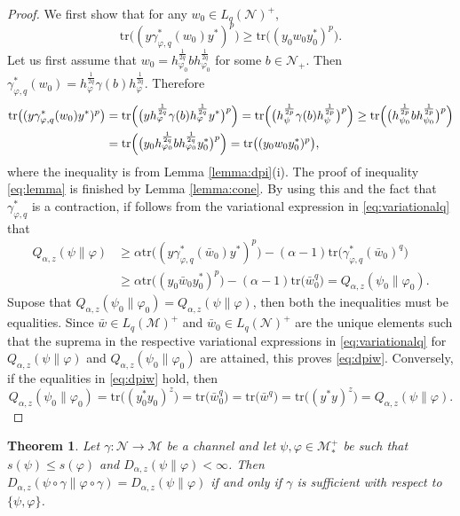 \documentclass[12pt]{article}
\newtheorem{theorem}{Theorem}[section]
\theoremstyle{definition}
\theoremstyle{remark}
\numberwithin{equation}{section}
\def\Me{\mathcal M}
\def\Ne{\mathcal N}
\def\Tr{\mathrm{tr}}
\def\ffi{\varphi}
\begin{document}
\begin{proof} We first show that  for any $w_0\in L_q(\Ne)^+$,
\begin{equation}\label{eq:lemma}
\Tr\bigl((y\gamma^*_{\ffi,q}(w_0)y^*)^p\bigr)\ge
\Tr\bigl((y_0w_0y_0^*)^p\bigr).
\end{equation}
Let us first assume that
$w_0=h_{\varphi_0}^{\frac1{2q}}bh_{\varphi_0}^{\frac1{2q}}$ for some $b\in \Ne_+$. Then 
$\gamma^*_{\varphi,q}(w_0)=h_{\varphi}^{\frac1{2q}}\gamma(b)h_{\varphi}^{\frac1{2q}}$.
Therefore
\begin{align*}
\Tr\bigl((y\gamma^*_{\varphi,q}(w_0)y^*)^p\bigr)
&=\Tr\Bigl(\bigl(yh_{\varphi}^{\frac1{2q}}\gamma(b)h_{\varphi}^{\frac1{2q}}y^*\bigr)^p\Bigr)=
\Tr\Bigl(\bigl(h_\psi^{\frac1{2p}}\gamma(b)h_\psi^{\frac1{2p}}\bigr)^p\Bigr)\ge
\Tr\Bigl(\bigl(h_{\psi_0}^{\frac1{2p}}bh_{\psi_0}^{\frac1{2p}}\bigr)^p\Bigr)\\
&=\Tr\Bigl(\bigl(y_0h_{\varphi_0}^{\frac1{2q}}bh_{\varphi_0}^{\frac1{2q}}y_0^*\bigr)^p\Bigr)
=\Tr\bigl((y_0w_0y_0^*)^p\bigr),
\end{align*}
where the inequality is from Lemma \ref{lemma:dpi}(i). The proof of inequality
\eqref{eq:lemma} is  finished  by Lemma \ref{lemma:cone}.
By using this and the fact that $\gamma^*_{\ffi,q}$ is a contraction, if follows from the variational
expression in \eqref{eq:variationalq} that
\begin{align*}
Q_{\alpha,z}(\psi\|\varphi)
&\ge \alpha\Tr\bigl((y\gamma^*_{\varphi,q}(\bar w_0)y^*)^p\bigr)-
(\alpha-1)\Tr\bigl(\gamma^*_{\varphi,q}(\bar w_0)^q\bigr)\\
&\ge \alpha\Tr\bigr((y_0\bar w_0 y_0^*)^p\bigr)-(\alpha-1)\Tr\bigl(\bar
w_0^q\bigr)=Q_{\alpha,z}(\psi_0\|\varphi_0).
\end{align*}
Supose that $Q_{\alpha,z}(\psi_0\|\varphi_0)=Q_{\alpha,z}(\psi\|\varphi)$, then both the
inequalities must be equalities. Since $\bar
w\in L_q(\Me)^+$ and $\bar w_0\in L_q(\Ne)^+$ are the unique elements such that the suprema
in the {\color{red}respective} variational expressions in \eqref{eq:variationalq} for
$Q_{\alpha,z}(\psi\|\varphi)$ and $Q_{\alpha,z}(\psi_0\|\varphi_0)$ are attained, this proves
\eqref{eq:dpiw}. Conversely, if the equalities in \eqref{eq:dpiw} hold, then
\[
Q_{\alpha,z}(\psi_0\|\ffi_0)=\Tr\bigl((y_0^*y_0)^z\bigr)=\Tr\bigl(\bar w_0^q\bigr)
=\Tr\bigl(\bar w^q\bigr)=\Tr\bigl((y^*y)^z\bigr)=Q_{\alpha,z}(\psi\|\ffi).
\]
\end{proof}


\begin{theorem}\label{thm:suffge1}
Let $\gamma:\Ne\to \Me$ be a channel and let $\psi,\varphi\in \Me_*^+$ be such that 
$s(\psi)\le s(\ffi)$ and $D_{\alpha,z}(\psi\|\varphi)<\infty$. Then
$D_{\alpha,z}(\psi\circ\gamma\|\ffi\circ\gamma)=D_{\alpha,z}(\psi\|\varphi)$ if and only if
$\gamma$ is sufficient with respect to $\{\psi,\ffi\}$.

\end{theorem}
\end{document}
